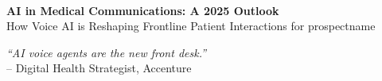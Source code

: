 \documentclass[10pt]{article}
\newcommand{\prospectname}{{ prospectname }}
\begin{document}
\begin{center}
    \vspace*{0.5cm}
    \\[0.6cm]
    {\LARGE\bfseries AI in Medical Communications: A 2025 Outlook}\\[0.4cm]
    {\large How Voice AI is Reshaping Frontline Patient Interactions for \prospectname}\\[1cm]
\end{center}

\vspace{0.2cm}
\begin{flushright}
    \textit{``AI voice agents are the new front desk.''} \\
    -- Digital Health Strategist, Accenture
\end{flushright}
\end{document}

